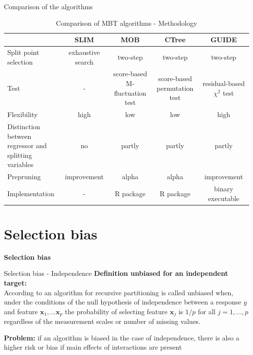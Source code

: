 \documentclass[9pt, xcolor=table]{beamer}
\begin{document}
\begin{frame}{Comparison of the algorithms}
\begin{table}[ht]
\centering \footnotesize
\begin{tabular}{|l|cccc|}
\hline
 & SLIM & MOB & CTree & GUIDE \\
\hline
\makecell[l]{Split point \\ selection} & exhaustive search & two-step & two-step & two-step \\
\hline
Test & - & \makecell[c]{score-based  \\ M-fluctuation test} & \makecell[c]{score-based  \\ permutation test} & \makecell{residual-based \\ $\chi^2$ test} \\
\hline
Flexibility & high & low & low & high \\
\hline
\makecell[l]{Distinction between \\ regressor and \\ splitting variables} & no & partly & partly & partly \\
\hline
Prepruning & improvement & alpha & alpha & improvement\\
\hline
Implementation & - & R package & R package & binary executable \\
\hline
\end{tabular}
\caption{Comparison of MBT algorithms - Methodology}
\label{tab:mbt_comparison}
\end{table}
    
\end{frame}



    

\section{Selection bias}
\begin{frame}
\centering
    \huge{\textbf{Selection bias}}
\end{frame}

\begin{frame}{Selection bias - Independence}
\textbf{Definition unbiased for an independent target:} \\
According to \citep{Hothorn.2006} an algorithm for recursive partitioning is called unbiased when, under the conditions of the null hypothesis of independence between a response $y$ and feature $\textbf{x}_{1},...\textbf{x}_{p}$ the probability of selecting feature $\textbf{x}_{j}$ is $1/p$ for all $j = 1,...,p$ regardless of the measurement scales or number of missing values. 

\vspace{0.5cm}
\textbf{Problem:} if an algorithm is biased in the case of independence, there is also a higher risk or bias if main effects of interactions are present
    
\end{frame}
\end{document}
